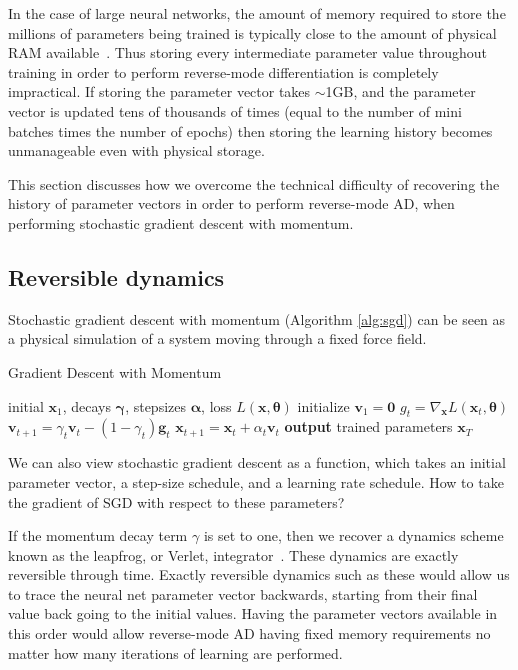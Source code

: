 \documentclass{article}
\newcommand{\vx}{\mathbf{x}}
\newcommand{\vv}{\mathbf{v}}
\newcommand{\vg}{\mathbf{g}}
\newcommand{\vzero}{\mathbf{0}}
\newcommand{\hypers}{{\boldsymbol{\theta}}}
\newcommand{\params}{\vx}
\newcommand{\decay}{\gamma}
\newcommand{\decays}{{\boldsymbol{\decay}}}
\newcommand{\stepsize}{\alpha}
\newcommand{\stepsizes}{{\boldsymbol{\stepsize}}}
\newcommand{\gradparamst}{\nabla_\params L(\params_t, \hypers)}
\begin{document}
In the case of large neural networks, the amount of memory required to store the millions of parameters being trained is typically close to the amount of physical RAM available~\cite{sequence2014}.
Thus storing every intermediate parameter value throughout training in order to perform reverse-mode differentiation is completely impractical.
If storing the parameter vector takes $\sim$1GB, and the parameter vector is updated tens of thousands of times (equal to the number of mini batches times the number of epochs) then storing the learning history becomes unmanageable even with physical storage.

This section discusses how we overcome the technical difficulty of recovering the history of parameter vectors in order to perform reverse-mode AD, when performing stochastic gradient descent with momentum.

\subsection{Reversible dynamics}

Stochastic gradient descent with momentum (Algorithm \ref{alg:sgd}) can be seen as a physical simulation of a system moving through a fixed force field.
%
\begin{algorithm}
   \caption{Gradient Descent with Momentum}
   \label{alg:sgd}
\begin{algorithmic}[1]
    initial $\vx_1$, decays $\decays$, stepsizes $\stepsizes$, loss $L(\params, \hypers)$
   \State initialize $\vv_1 = \vzero$
   \State $g_t = \gradparamst$ 
   \State $\vv_{t+1} = \decay_t \vv_t - (1 - \decay_t) \vg_t$   \label{step:update velocity}
   \State $\vx_{t+1} = \vx_t + \stepsize_t \vv_t$  \label{step:update position}
   \EndFor
   \State \textbf{output} trained parameters $\vx_T$
\end{algorithmic}
\end{algorithm}
%
We can also view stochastic gradient descent as a function, which takes an initial parameter vector, a step-size schedule, and a learning rate schedule.
How to take the gradient of SGD with respect to these parameters?

If the momentum decay term $\gamma$ is set to one, then we recover a dynamics scheme known as the leapfrog, or Verlet, integrator~\citep{leapfrog1995}.
These dynamics are exactly reversible through time.
Exactly reversible dynamics such as these would allow us to trace the neural net parameter vector backwards, starting from their final value back going to the initial values.
Having the parameter vectors available in this order would allow reverse-mode AD having fixed memory requirements no matter how many iterations of learning are performed.
\end{document}
